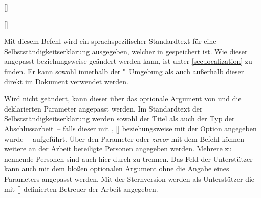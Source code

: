\begin{Declaration*}{}
\begin{Declaration*}{}
\begin{Declaration*}{}
\begin{Declaration}{[]}
\begin{Declaration}[v2.05]{[\LParameter]}
\begin{Declaration}{}
\begin{Declaration}{}
\begin{Declaration}{}
\begin{Declaration}{}
\begin{Declaration}[v2.02]{}
\begin{Declaration}[v2.02]{%
}
\begin{Declaration}[v2.02]{%
}
\begin{Declaration}{}
\printdeclarationlist%
%
%
Mit diesem Befehl wird ein sprachspezifischer Standardtext für eine 
Selbstständigkeitserklärung ausgegeben, welcher in  
gespeichert ist. Wie dieser angepasst beziehungsweise geändert werden kann, ist 
unter \autoref{sec:localization} zu finden. Er kann sowohl innerhalb der 
"~Umgebung als auch außerhalb dieser direkt im 
Dokument verwendet werden. 

Wird  nicht geändert, kann dieser über das optionale 
Argument von  und die deklarierten Parameter angepasst 
werden. Im Standardtext der Selbstständigkeitserklärung werden sowohl der Titel 
als auch der Typ der Abschlussarbeit~-- falls dieser mit , 
[] beziehungsweise mit der 
Option  angegeben wurde~-- aufgeführt. Über den Parameter 
 oder \emph{zuvor} mit dem Befehl 
 können weitere an der Arbeit beteiligte Personen angegeben 
werden. Mehrere zu nennende Personen sind auch hier durch  zu 
trennen. Das Feld der Unterstützer kann auch mit dem bloßen optionalen Argument 
ohne die Angabe eines Parameters angepasst werden. 
Mit der Sternversion  werden als Unterstützer die mit 
[] definierten Betreuer der Arbeit 
angegeben.


\end{Declaration}
\end{Declaration}
\end{Declaration}
\end{Declaration}
\end{Declaration}
\end{Declaration}
\end{Declaration}
\end{Declaration}
\end{Declaration}
\end{Declaration}
\end{Declaration*}
\end{Declaration*}
\end{Declaration*}
